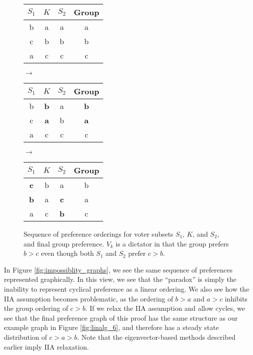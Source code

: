 \begin{figure}[!htb]
\centering
\begin{tabular}{ c | c | c | c }
 $S_1$ & $K$ & $S_2$ & Group \\ 
 \hline
 b & a & a & a \\ 
 c & b & b & b \\  
 a & c & c & c
\end{tabular}
 $\rightarrow$
\begin{tabular}{ c | c | c | c }
 $S_1$ & $K$ & $S_2$ & Group \\ 
 \hline
 b & \textbf{b} & a & \textbf{b} \\ 
 c & \textbf{a} & b & \textbf{a} \\  
 a & c & c & c
\end{tabular}
 $\rightarrow$
\begin{tabular}{ c | c | c | c }
 $S_1$ & $K$ & $S_2$ & Group \\ 
 \hline
 \textbf{c} & b & a & b \\ 
 \textbf{b} & a & \textbf{c} & a \\  
 a & c & \textbf{b} & c
\end{tabular}
\caption{Sequence of preference orderings for voter subsets $S_1$, $K$, and $S_2$, and final group preference. $V_k$ is a dictator in that the group prefers $b > c$ even though both $S_1$ and $S_2$ prefer $c > b$.}
\label{fig:impossiblity_tables} 
\end{figure}

In Figure \ref{fig:impossiblity_graphs}, we see the same sequence of preferences represented graphically.
In this view, we see that the ``paradox'' is simply the inability to represent cyclical preference as a linear ordering.
We also see how the IIA assumption becomes problematic, as the ordering of $b > a$ and $a > c$ inhibits the group ordering of $c > b$.
If we relax the IIA assumption and allow cycles, we see that the final preference graph of this proof has the same structure as our example graph in Figure \ref{fig:linalg_6}, and therefore has a steady state distribution of $c > a > b$.
Note that the eigenvector-based methods described earlier imply IIA relaxation.

